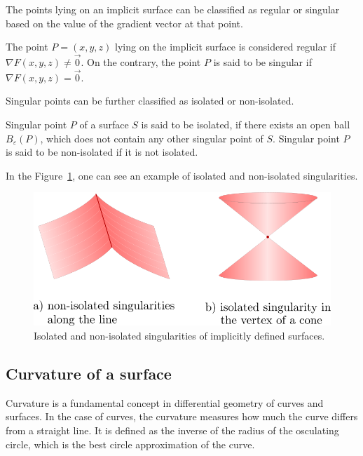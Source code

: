 The points lying on an implicit surface can be classified as regular or
singular based on the value of the gradient vector at that point.

\begin{definition}
    The point $P=(x,y,z)$ lying on the implicit surface is considered regular
    if $\nabla F(x, y, z) \neq \vec{0}$. On the contrary, the point $P$ is said to be 
    singular if $\nabla F(x, y, z) = \vec{0}$.
\end{definition}

Singular points can be further classified as isolated or non-isolated.

\begin{definition}
    Singular point $P$ of a surface $S$ is said to be isolated,
    if there exists an open ball $B_\varepsilon(P)$, which does not 
    contain any other singular point of $S$.
    Singular point $P$ is said to be non-isolated if it is not isolated.
\end{definition}

In the Figure~\ref{img:2}, one can see an example of isolated and non-isolated
singularities.

\begin{figure}
    \centerline{\includegraphics[scale=0.5]{images/img2}}
    \caption[Isolated and non-isolated singularities of an implicitly defined surfaces]
    {Isolated and non-isolated singularities of implicitly defined surfaces.}
    \label{img:2}
\end{figure}

\subsection{Curvature of a surface}

Curvature is a fundamental concept in differential geometry of curves and surfaces.
In the case of curves, the curvature measures how much the curve differs from a 
straight line. It is defined as the inverse of the radius of the osculating circle,
which is the best circle approximation of the curve.

